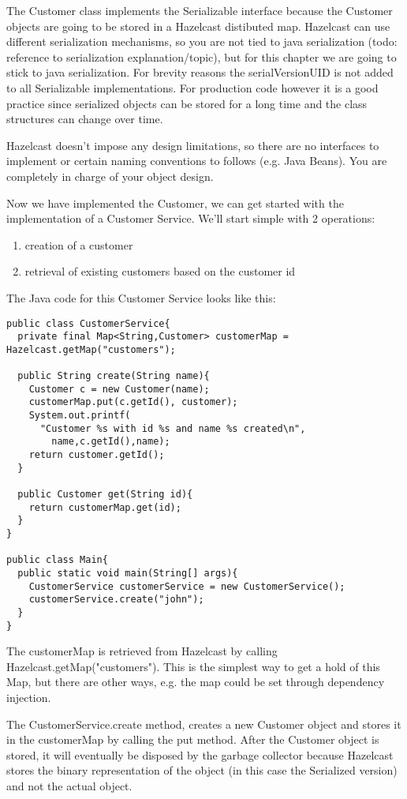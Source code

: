 The Customer class implements the Serializable interface because the Customer objects are going to be stored in a Hazelcast distibuted map. Hazelcast can use different serialization mechanisms, so you are not tied to java serialization (todo: reference to serialization explanation/topic), but for this chapter we are going to stick to java serialization. For brevity reasons the serialVersionUID is not added to all Serializable implementations. For production code however it is a good practice since serialized objects can be stored for a long time and the class structures can change over time. 

Hazelcast doesn't impose any design limitations, so there are no interfaces to implement or certain naming conventions to follows (e.g. Java Beans). You are completely in charge of your object design.

Now we have implemented the Customer, we can get started with the implementation of a Customer Service. We'll start simple with 2 operations:
\begin{enumerate}
\item creation of a customer
\item retrieval of existing customers based on the customer id
\end{enumerate}

The Java code for this Customer Service looks like this:

\begin{verbatim}
public class CustomerService{
  private final Map<String,Customer> customerMap = Hazelcast.getMap("customers");
  
  public String create(String name){
    Customer c = new Customer(name);
    customerMap.put(c.getId(), customer);
    System.out.printf(
      "Customer %s with id %s and name %s created\n",
        name,c.getId(),name);
    return customer.getId();
  }
  
  public Customer get(String id){
    return customerMap.get(id);
  } 
}

public class Main{
  public static void main(String[] args){
    CustomerService customerService = new CustomerService();
    customerService.create("john");
  }
}
\end{verbatim}

The customerMap is retrieved from Hazelcast by calling Hazelcast.getMap("customers"). This is the simplest way to get a hold of this Map, but there are other ways, e.g. the map could be set through dependency injection.

The CustomerService.create method, creates a new Customer object and stores it in the customerMap by calling the put method. After the Customer object is stored, it will eventually be disposed by the garbage collector because Hazelcast stores the binary representation of the object (in this case the Serialized version) and not the actual object.

